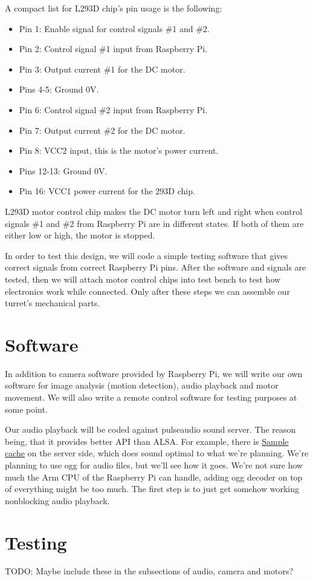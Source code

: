 \documentclass[english,11pt,twoside,a4paper]{article}
\begin{document}
A compact list for L293D chip's pin usage is the following:
\begin{itemize}
\item Pin 1: Enable signal for control signals \#1 and \#2.
\item Pin 2: Control signal \#1 input from Raspberry Pi.
\item Pin 3: Output current \#1 for the DC motor.
\item Pins 4-5: Ground 0V.
\item Pin 6: Control signal \#2 input from Raspberry Pi.
\item Pin 7: Output current \#2 for the DC motor.
\item Pin 8: VCC2 input, this is the motor's power current.
\item Pins 12-13: Ground 0V.
\item Pin 16: VCC1 power current for the 293D chip.
\end{itemize}

L293D motor control chip makes the DC motor turn left and right when control signals \#1 and \#2 from Raspberry Pi are in different states. If both of them are either low or high, the motor is stopped.

In order to test this design, we will code a simple testing software that gives correct signals from correct Raspberry Pi pins. After the software and signals are tested, then we will attach motor control chips into test bench to test how electronics work while connected. Only after these steps we can assemble our turret's mechanical parts.

\section{Software}
In addition to camera software provided by Raspberry Pi, we will write our own software for image analysis (motion detection), audio playback and motor movement. We will also write a remote control software for testing purposes at some point.

Our audio playback will be coded against pulseaudio sound server. The reason being, that it provides better API than ALSA. For example, there is \href{http://freedesktop.org/software/pulseaudio/doxygen/scache.html}{Sample cache} on the server side, which does sound optimal to what we're planning. We're planning to use ogg for audio files, but we'll see how it goes. We're not sure how much the Arm CPU of the Raspberry Pi can handle, adding ogg decoder on top of everything might be too much. The first step is to just get somehow working nonblocking audio playback.

\section{Testing}
TODO: Maybe include these in the subsections of audio, camera and motors?
\end{document}
